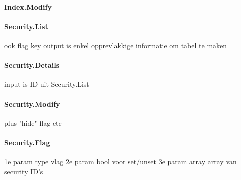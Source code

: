 \paragraph{Index.Modify}

\paragraph{Security.List}

ook flag key
output is enkel opprevlakkige informatie om tabel te maken

\paragraph{Security.Details}

input is ID uit Security.List

\paragraph{Security.Modify}

plus "hide" flag etc

\paragraph{Security.Flag}

1e param type vlag
2e param bool voor set/unset
3e param array array van security ID's


